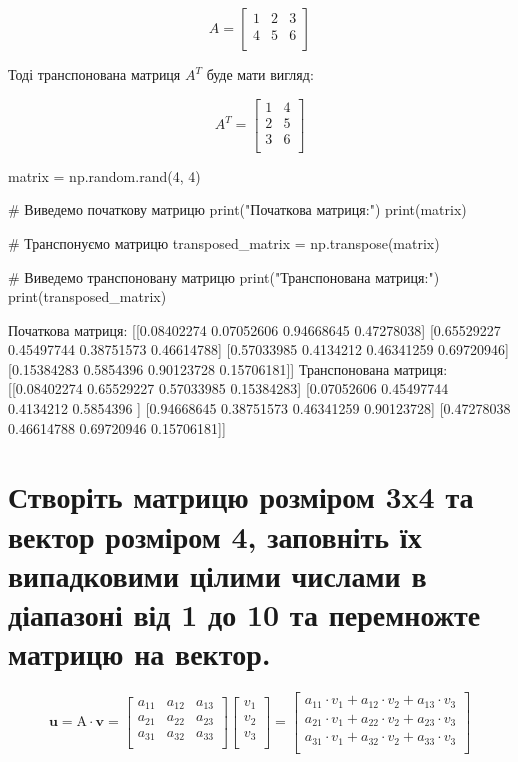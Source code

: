 \documentclass[]{article}
\newcounter{pythoncode}
\begin{document}
\[A =
	\begin{bmatrix}
		1 & 2 & 3 \\
		4 & 5 & 6 \\
	\end{bmatrix}
\]

Тоді транспонована матриця $ A^{T} $ буде мати вигляд:

\[
	A^T =
	\begin{bmatrix}
		1 & 4 \\
		2 & 5 \\
		3 & 6 \\
	\end{bmatrix}
\]

\begin{pythoncode}
    matrix = np.random.rand(4, 4)

    # Виведемо початкову матрицю
    print("Початкова матриця:")
    print(matrix)

    # Транспонуємо матрицю
    transposed_matrix = np.transpose(matrix)

    # Виведемо транспоновану матрицю
    print("Транспонована матриця:")
    print(transposed_matrix)
\end{pythoncode}

\begin{out}
	Початкова матриця:
	[[0.08402274 0.07052606 0.94668645 0.47278038]
	 [0.65529227 0.45497744 0.38751573 0.46614788]
	 [0.57033985 0.4134212  0.46341259 0.69720946]
	 [0.15384283 0.5854396  0.90123728 0.15706181]]
	Транспонована матриця:
	[[0.08402274 0.65529227 0.57033985 0.15384283]
	 [0.07052606 0.45497744 0.4134212  0.5854396 ]
	 [0.94668645 0.38751573 0.46341259 0.90123728]
	 [0.47278038 0.46614788 0.69720946 0.15706181]]
\end{out}

\section{Створіть матрицю розміром 3x4 та вектор розміром 4, заповніть їх випадковими цілими числами в діапазоні від 1 до 10 та перемножте матрицю на вектор.}
\[
	\mathbf{u} = \mathrm{A} \cdot \mathbf{v} =
	\begin{bmatrix}
		a_{11} & a_{12} & a_{13} \\
		a_{21} & a_{22} & a_{23} \\
		a_{31} & a_{32} & a_{33} \\
	\end{bmatrix}
	\begin{bmatrix}
		v_1 \\
		v_2 \\
		v_3 \\
	\end{bmatrix}
	=
	\begin{bmatrix}
		a_{11} \cdot v_1 + a_{12} \cdot v_2 + a_{13} \cdot v_3 \\
		a_{21} \cdot v_1 + a_{22} \cdot v_2 + a_{23} \cdot v_3 \\
		a_{31} \cdot v_1 + a_{32} \cdot v_2 + a_{33} \cdot v_3 \\
	\end{bmatrix}
\]
\end{document}
